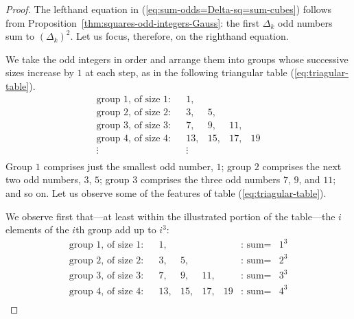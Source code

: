 \begin{proof}
The lefthand equation in (\ref{eq:sum-odds=Delta-sq=sum-cubes}) follows from 
Proposition~\ref{thm:squares-odd-integers-Gauss}: the first $\Delta_k$ odd numbers sum
to $(\Delta_k)^2$.  Let us focus, therefore, on the righthand equation.

\medskip

We take the odd integers in order and arrange them into groups whose successive sizes
increase by $1$ at each step, as in the following triangular table (\ref{eq:triagular-table}).
\begin{equation}
\label{eq:triagular-table}
\begin{array}{llrrrrclcc}
\mbox{group $1$, of size 1:} & &
1,  &    &     &      \\
\mbox{group $2$, of size 2:} & &
3,  &  5, &     &      \\
\mbox{group $3$, of size 3:} & &
7,  &  9, & 11, &     \\
\mbox{group $4$, of size 4:} & &
13, & 15, & 17, & 19   \\
\vdots & & \vdots \\
\end{array}
\end{equation}
Group $1$ comprises just the smallest odd number, $1$;
group $2$ comprises the next two odd numbers, $3$, $5$; group $3$ comprises the
three odd numbers $7$,  $9$,  and $11$; and so on.
Let us observe some of the features of table (\ref{eq:triagular-table}).

We observe first that---at least within the illustrated portion of the table---the $i$ elements
of the $i$th group add up to $i^3$:
\[
\begin{array}{llrrrrclcc}
\mbox{group $1$, of size 1:} & &
1,  &    &     &     & \mbox{: sum} = &  1^3 \\
\mbox{group $2$, of size 2:} & &
3,  &  5, &     &    & \mbox{: sum} =  &  2^3 \\
\mbox{group $3$, of size 3:} & &
7,  &  9, & 11, &    &  \mbox{: sum} = &  3^3 \\
\mbox{group $4$, of size 4:} & &
13, & 15, & 17, & 19 & \mbox{: sum} =  &  4^3 \\
\end{array}
\]


\end{proof}
